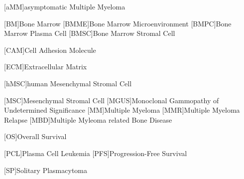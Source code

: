 
%
\label{sec:Abbreviations}%

{
    \small
    \begin{acronym}
        [aMM]{asymptomatic Multiple Myeloma}

        [BM]{Bone Marrow}
        [BMME]{Bone Marrow Microenvironment}
        [BMPC]{Bone Marrow Plasma Cell}
        [BMSC]{Bone Marrow Stromal Cell}

        [CAM]{Cell Adhesion Molecule}

        [ECM]{Extracellular Matrix}

        [hMSC]{human Mesenchymal Stromal Cell}

        [MSC]{Mesenchymal Stromal Cell}
        [MGUS]{Monoclonal Gammopathy of Undetermined Significance}
        [MM]{Multiple Myeloma}
        [MMR]{Multiple Myeloma Relapse}
        [MBD]{Multiple Myleoma related Bone Disease}

        [OS]{Overall Survival}

        [PCL]{Plasma Cell Leukemia}
        [PFS]{Progression-Free Survival}

        [SP]{Solitary Plasmacytoma}



    \end{acronym}
}